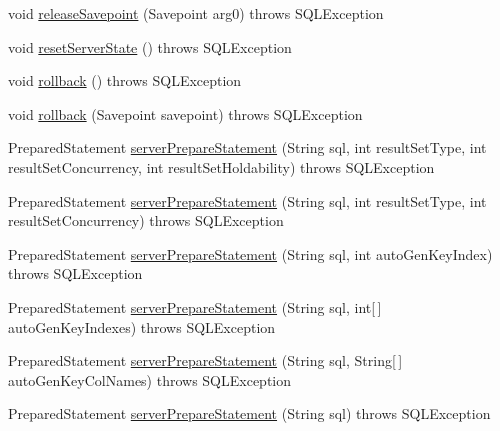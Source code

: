 \begin{DoxyCompactItemize}
\item 
void \mbox{\hyperlink{classcom_1_1mysql_1_1cj_1_1jdbc_1_1ha_1_1_multi_host_my_s_q_l_connection_a5c0b01a8ac3f23eac0e521c2a6cd3c03}{release\+Savepoint}} (Savepoint arg0)  throws S\+Q\+L\+Exception 
\item 
void \mbox{\hyperlink{classcom_1_1mysql_1_1cj_1_1jdbc_1_1ha_1_1_multi_host_my_s_q_l_connection_aa4aba4efd08774027532a7a9092bca57}{reset\+Server\+State}} ()  throws S\+Q\+L\+Exception 
\item 
void \mbox{\hyperlink{classcom_1_1mysql_1_1cj_1_1jdbc_1_1ha_1_1_multi_host_my_s_q_l_connection_a49c2cd6924eb0d929f0759b2cf0c440a}{rollback}} ()  throws S\+Q\+L\+Exception 
\item 
void \mbox{\hyperlink{classcom_1_1mysql_1_1cj_1_1jdbc_1_1ha_1_1_multi_host_my_s_q_l_connection_a97829e74051e90c4363098f4797b7dd7}{rollback}} (Savepoint savepoint)  throws S\+Q\+L\+Exception 
\item 
Prepared\+Statement \mbox{\hyperlink{classcom_1_1mysql_1_1cj_1_1jdbc_1_1ha_1_1_multi_host_my_s_q_l_connection_aa64dae9148fe8777c14bf8dbe9ebebd1}{server\+Prepare\+Statement}} (String sql, int result\+Set\+Type, int result\+Set\+Concurrency, int result\+Set\+Holdability)  throws S\+Q\+L\+Exception 
\item 
Prepared\+Statement \mbox{\hyperlink{classcom_1_1mysql_1_1cj_1_1jdbc_1_1ha_1_1_multi_host_my_s_q_l_connection_ae6fa263dc52294e1239edd02a280ab6d}{server\+Prepare\+Statement}} (String sql, int result\+Set\+Type, int result\+Set\+Concurrency)  throws S\+Q\+L\+Exception 
\item 
Prepared\+Statement \mbox{\hyperlink{classcom_1_1mysql_1_1cj_1_1jdbc_1_1ha_1_1_multi_host_my_s_q_l_connection_a26a0ffb4b44f358479e5a39a3241837f}{server\+Prepare\+Statement}} (String sql, int auto\+Gen\+Key\+Index)  throws S\+Q\+L\+Exception 
\item 
Prepared\+Statement \mbox{\hyperlink{classcom_1_1mysql_1_1cj_1_1jdbc_1_1ha_1_1_multi_host_my_s_q_l_connection_a5c69e6b4ee9462919ab63d9e3c563294}{server\+Prepare\+Statement}} (String sql, int\mbox{[}$\,$\mbox{]} auto\+Gen\+Key\+Indexes)  throws S\+Q\+L\+Exception 
\item 
Prepared\+Statement \mbox{\hyperlink{classcom_1_1mysql_1_1cj_1_1jdbc_1_1ha_1_1_multi_host_my_s_q_l_connection_ae0fc18db059bf9625bc8741334de6eef}{server\+Prepare\+Statement}} (String sql, String\mbox{[}$\,$\mbox{]} auto\+Gen\+Key\+Col\+Names)  throws S\+Q\+L\+Exception 
\item 
Prepared\+Statement \mbox{\hyperlink{classcom_1_1mysql_1_1cj_1_1jdbc_1_1ha_1_1_multi_host_my_s_q_l_connection_a7db176300b273436df94f2cc48e986af}{server\+Prepare\+Statement}} (String sql)  throws S\+Q\+L\+Exception 

\end{DoxyCompactItemize}
